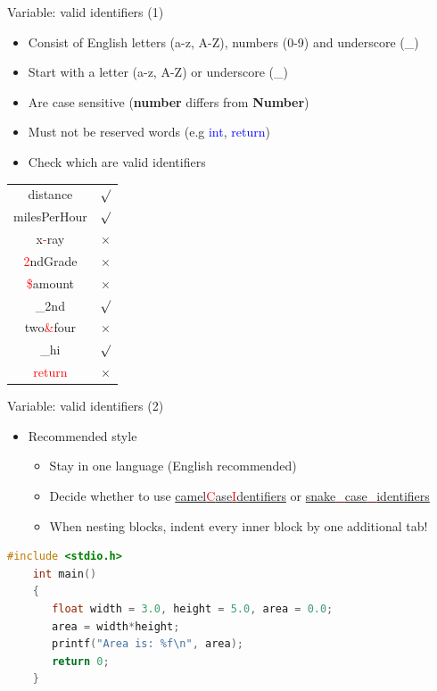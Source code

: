 \begin{frame}[fragile]{Variable: valid identifiers (1)}
	\begin{itemize}
		\item {Consist of English letters (a-z, A-Z), numbers (0-9) and underscore (\_)}
		\item {Start with a letter (a-z, A-Z) or underscore (\_)}
		\item {Are case sensitive (\textbf{number} differs from \textbf{Number})}
		\item {Must not be reserved words (e.g \textcolor{blue}{int}, \textcolor{blue}{return})}
		\item {Check which are valid identifiers}
	\end{itemize}
	\begin{table}
	\begin{center}
		\begin{tabular}{|c|c|}
		\hline
		distance & $\surd$\\ 
		milesPerHour & $\surd$\\
		x\textcolor{red}{-}ray & $\times$\\
		\textcolor{red}{2}ndGrade & $\times$\\
		\textcolor{red}{\$}amount & $\times$ \\
		\_2nd & $\surd$\\
		two\textcolor{red}{\&}four & $\times$\\
		\_hi & $\surd$\\
		\textcolor{red}{return} & $\times$\\ \hline
		\end{tabular}
	\end{center}
	\end{table}
\end{frame}

\begin{frame}[fragile]{Variable: valid identifiers (2)}
	\begin{itemize}
		\item {Recommended style}
		\begin{itemize}
			\item {Stay in one language (English recommended)}
			\item {Decide whether to use \underline{camel\textcolor{red}{C}ase\textcolor{red}{I}dentifiers} or \underline{snake\textcolor{red}{\_}case\textcolor{red}{\_}identifiers}}
			\item {When nesting blocks, indent every inner block by one additional tab!}
		\end{itemize}
	\end{itemize}
	\begin{lstlisting}[language=c, frame=none]
	#include <stdio.h>
	int main()
	{
	   float width = 3.0, height = 5.0, area = 0.0;
	   area = width*height;
	   printf("Area is: %f\n", area);
	   return 0;
	}
	\end{lstlisting}
\end{frame}

